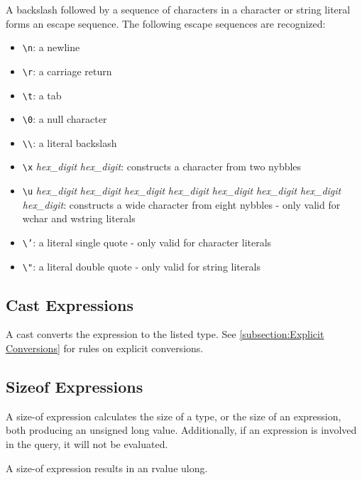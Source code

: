 \documentclass[letterpaper,12pt]{book}
\begin{document}
A backslash followed by a sequence of characters in a character or string literal forms an escape sequence. The following escape sequences are recognized:

\begin{itemize}
	\item \texttt{\textbackslash n}: a newline
	\item \texttt{\textbackslash r}: a carriage return
	\item \texttt{\textbackslash t}: a tab
	\item \texttt{\textbackslash 0}: a null character
	\item \texttt{\textbackslash\textbackslash}: a literal backslash
	\item \texttt{\textbackslash x} \textit{hex\_digit} \textit{hex\_digit}: constructs a character from two nybbles
	\item \texttt{\textbackslash u} \textit{hex\_digit} \textit{hex\_digit} \textit{hex\_digit} \textit{hex\_digit} \textit{hex\_digit} \textit{hex\_digit} \textit{hex\_digit} \textit{hex\_digit}: constructs a wide character from eight nybbles - only valid for wchar and wstring literals
	\item \texttt{\textbackslash '}: a literal single quote - only valid for character literals
	\item \texttt{\textbackslash "}: a literal double quote - only valid for string literals
\end{itemize}

\subsection{Cast Expressions}

A cast converts the expression to the listed type. See \ref{subsection:Explicit Conversions} for rules on explicit conversions.

\subsection{Sizeof Expressions}

A size-of expression calculates the size of a type, or the size of an expression, both producing an unsigned long value. Additionally, if an expression is involved in the query, it will not be evaluated.

A size-of expression results in an rvalue ulong.
\end{document}
